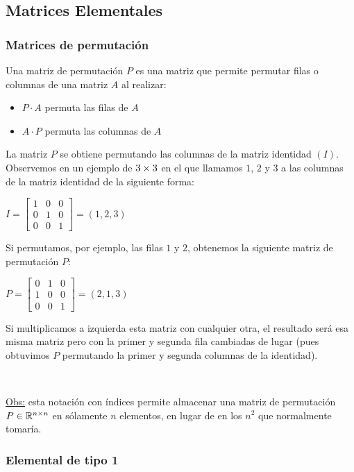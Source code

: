 \documentclass[]{article}
\begin{document}
\subsection{Matrices Elementales}

\subsubsection{Matrices de permutación}
Una matriz de permutación $P$ es una matriz que permite permutar filas o columnas de una matriz $A$ al realizar:
\begin{itemize}
	\item $P \cdot A$ permuta las filas de $A$
	\item $A \cdot P$ permuta las columnas de $A$
\end{itemize}

La matriz $P$ se obtiene permutando las columnas de la matriz identidad $(I)$. Observemos en un ejemplo de $3 \times 3$ en el que llamamos $1$, $2$ y $3$ a las columnas de la matriz identidad de la siguiente forma:
\begin{center}
	$I = \begin{bmatrix}
		1&0&0\\
		0&1&0\\
		0&0&1
	\end{bmatrix} = (1,2,3)$
\end{center}

Si permutamos, por ejemplo, las filas $1$ y $2$, obtenemos la siguiente matriz de permutación $P$:
\begin{center}
	$P=\begin{bmatrix}
		0&1&0\\
		1&0&0\\
		0&0&1
	\end{bmatrix} = (2,1,3)$
\end{center}

Si multiplicamos a izquierda esta matriz con cualquier otra, el resultado será esa misma matriz pero con la primer y segunda fila cambiadas de lugar (pues obtuvimos $P$ permutando la primer y segunda columnas de la identidad).

~\newline

\underline{Obs:} esta notación con índices permite almacenar una matriz de permutación $P\in\mathbb{R}^{n\times n}$ en sólamente $n$ elementos, en lugar de en los $n^2$ que normalmente tomaría.


\subsubsection{Elemental de tipo 1}
\end{document}

